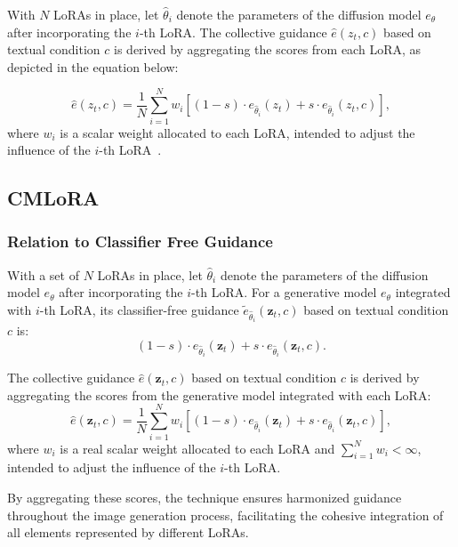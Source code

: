 With $N$ LoRAs in place, let $\hat\theta_{i}$ denote the parameters of the diffusion model $e_{\theta}$ after incorporating the $i$-th LoRA. The collective guidance $\hat{e}(z_{t},c)$ based on textual condition $c$ is derived by aggregating the scores from each LoRA, as depicted in the equation below:

\begin{equation}
    \label{loracomposite}
    \hat{e}(z_{t},c) = \frac{1}{N}\sum^{N}_{i=1}w_{i}[(1-s)\cdot e_{\hat\theta_{i}}(z_{t})+s\cdot e_{\hat\theta_{i}}(z_{t},c)],
\end{equation}
where $w_i$ is a scalar weight allocated to each LoRA, intended to adjust the influence of the $i$-th LoRA~\citep{multilora}.

\subsection{CMLoRA}
\subsubsection{Relation to Classifier Free Guidance}
With a set of $N$ LoRAs in place, let $\hat\theta_{i}$ denote the parameters of the diffusion model $e_{\theta}$ after incorporating the $i$-th LoRA. For a generative model $e_{\theta}$ integrated with $i$-th LoRA, its classifier-free guidance $\tilde{e}_{\hat\theta_{i}}(\mathbf{z}_{t},c)$ based on textual condition $c$ is:
\begin{equation}
(1-s)\cdot e_{\hat\theta_{i}}(\mathbf{z}_{t})+s\cdot e_{\hat\theta_{i}}(\mathbf{z}_{t},c).
\end{equation}

The collective guidance $\hat{e}(\mathbf{z}_{t},c)$ based on textual condition $c$ is derived by aggregating the scores from the generative model integrated with each LoRA: 
\begin{equation}
\hat{e}(\mathbf{z}_{t},c) = \frac{1}{N}\sum^{N}_{i=1}w_{i}[(1-s)\cdot e_{\hat\theta_{i}}(\mathbf{z}_{t})+s\cdot e_{\hat\theta_{i}}(\mathbf{z}_{t},c)],
\end{equation}
where $w_i$ is a real scalar weight allocated to each LoRA and $\sum^{N}_{i=1}w_{i}<\infty$, intended to adjust the influence of the $i$-th LoRA.

By aggregating these scores, the technique ensures harmonized guidance throughout the image generation process, facilitating the cohesive integration of all elements represented by different LoRAs.


